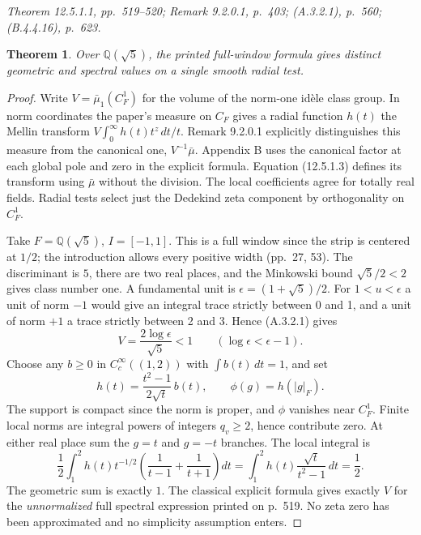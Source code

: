 \documentclass[11pt,reqno]{amsart}
\newtheorem{theorem}{Theorem}[section]
\numberwithin{equation}{section}
\newcommand{\Q}{\mathbb Q}\newcommand{\R}{\mathbb R}\newcommand{\C}{\mathbb C}\newcommand{\Z}{\mathbb Z}
\begin{document}
\textit{Theorem 12.5.1.1, pp.~519--520; Remark 9.2.0.1, p.~403; (A.3.2.1), p.~560; (B.4.4.16), p.~623.}\par
\begin{theorem}Over \(\Q(\sqrt5)\), the printed full-window formula gives distinct geometric and spectral values on a single smooth radial test.\end{theorem}\begin{proof}
Write \(V=\bar\mu_1(C_F^1)\) for the volume of the norm-one idèle class group. In norm coordinates the paper's measure on \(C_F\) gives a radial function \(h(t)\) the Mellin transform \(V\int_0^\infty h(t)t^z\,dt/t\). Remark 9.2.0.1 explicitly distinguishes this measure from the canonical one, \(V^{-1}\bar\mu\). Appendix B uses the canonical factor at each global pole and zero in the explicit formula. Equation (12.5.1.3) defines its transform using \(\bar\mu\) without the division. The local coefficients agree for totally real fields. Radial tests select just the Dedekind zeta component by orthogonality on \(C_F^1\).

Take \(F=\Q(\sqrt5)\), \(I=[-1,1]\). This is a full window since the strip is centered at \(1/2\); the introduction allows every positive width (pp.~27, 53). The discriminant is \(5\), there are two real places, and the Minkowski bound \(\sqrt5/2<2\) gives class number one. A fundamental unit is \(\epsilon=(1+\sqrt5)/2\). For \(1<u<\epsilon\) a unit of norm \(-1\) would give an integral trace strictly between 0 and 1, and a unit of norm \(+1\) a trace strictly between 2 and 3. Hence (A.3.2.1) gives
\[
       V=\frac{2\log\epsilon}{\sqrt5}<1
       \qquad (\log\epsilon<\epsilon-1).
\]
Choose any \(b\ge0\) in \(C_c^\infty((1,2))\) with \(\int b(t)\,dt=1\), and set
\[
 h(t)=\frac{t^2-1}{2\sqrt t}\,b(t),\qquad \phi(g)=h(|g|_F).
\]
The support is compact since the norm is proper, and \(\phi\) vanishes near \(C_F^1\). Finite local norms are integral powers of integers \(q_v\ge2\), hence contribute zero. At either real place sum the \(g=t\) and \(g=-t\) branches. The local integral is
\[
 \frac12\int_1^2h(t)t^{-1/2}\left(\frac1{t-1}+\frac1{t+1}\right)dt
 =\int_1^2h(t)\frac{\sqrt t}{t^2-1}\,dt=\frac12 .
\]
The geometric sum is exactly \(1\). The classical explicit formula gives exactly \(V\) for the \emph{unnormalized} full spectral expression printed on p.~519. No zeta zero has been approximated and no simplicity assumption enters.

\end{proof}
\end{document}
